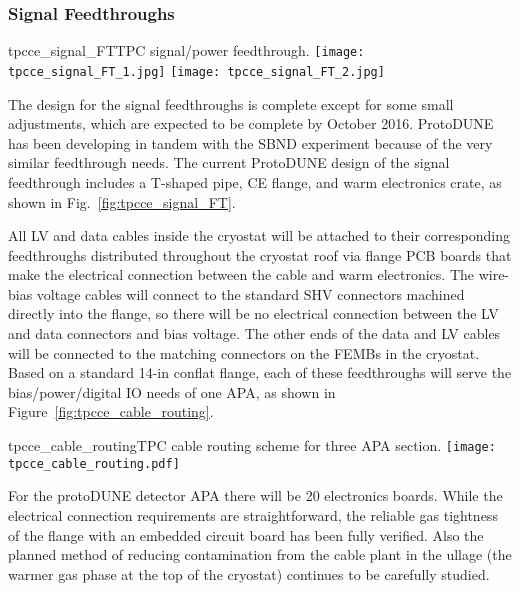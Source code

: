 %
\subsubsection{Signal Feedthroughs}
\label{subsubsec:ce_feedthroughs}

\begin{cdrfigure}{tpcce_signal_FT}{TPC signal/power feedthrough.}
\texttt{[image: tpcce\_signal\_FT\_1.jpg]}
\texttt{[image: tpcce\_signal\_FT\_2.jpg]}
\end{cdrfigure}

The design for the signal feedthroughs is complete except for some small adjustments,
which are expected to be complete by October 2016.
ProtoDUNE has been developing in tandem with the SBND experiment because of the very similar feedthrough needs.
The current ProtoDUNE design of the signal feedthrough includes a T-shaped pipe, CE flange, and warm electronics crate, as shown in Fig.~\ref{fig:tpcce_signal_FT}.

All LV and data cables inside the cryostat will be attached to their corresponding feedthroughs 
distributed throughout the cryostat roof via flange PCB boards that make the electrical connection
between the cable and warm electronics. The wire-bias voltage cables will connect to the standard SHV
connectors machined directly into the flange, so there will be no electrical connection between 
the LV and data connectors and bias voltage.
The other ends of the data and LV cables will be connected to the matching connectors on the FEMBs in the cryostat.
Based on a standard 14-in conflat flange,
each of these feedthroughs will serve the bias/power/digital IO needs of one APA, as shown 
in Figure~\ref{fig:tpcce_cable_routing}.  

\begin{cdrfigure}{tpcce_cable_routing}{TPC cable routing scheme for three APA section.}
\texttt{[image: tpcce\_cable\_routing.pdf]}
\end{cdrfigure}


For the protoDUNE detector APA there will be 20 electronics boards.
While the electrical connection requirements are straightforward,
the reliable gas tightness of the flange with an embedded circuit board has been fully verified.
Also the planned method of reducing contamination from the cable plant in the ullage
(the warmer gas phase at the top of the cryostat) 
continues to be carefully studied.

